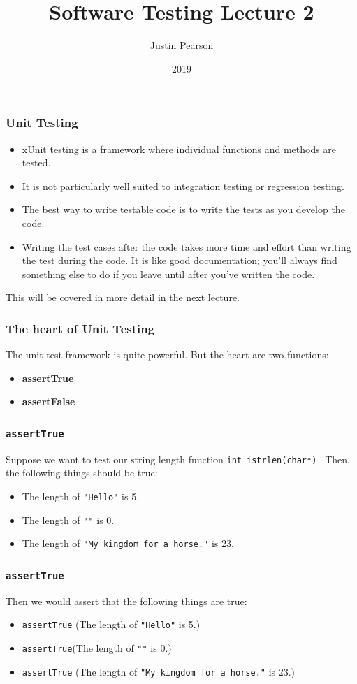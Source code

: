 \documentclass{beamer}
\title{Software Testing Lecture 2}
\author{Justin Pearson}
\date{2019}
\begin{document}
\begin{frame}
  \maketitle
\end{frame}
\begin{frame}
  \frametitle{Unit Testing}
  \begin{itemize}
  \item xUnit testing is a framework where individual functions and
    methods are tested. 
  \item It is not particularly well suited to integration testing or
    regression testing.
  \item The best way to write testable code is to write the tests as
    you develop the code. 
  \item Writing the test cases after the code takes more time and
    effort than writing the test during the code. It is like good
    documentation; you'll always find something else to do if you leave
    until after you've written the code.  
  \end{itemize}
  This will be covered in more detail in the next lecture.
\end{frame}
\begin{frame}
  \frametitle{The heart of Unit Testing}

  The unit test framework is quite powerful. But the heart are two
  functions:
  \begin{itemize}
  \item {\bf assertTrue} 
  \item {\bf assertFalse}
  \end{itemize}
\end{frame}

\begin{frame}
  \frametitle{{\tt assertTrue}}
 Suppose we want to test our string length function {\tt int
   istrlen(char*) }
Then, the following things should be true:
\begin{itemize}
\item The length of {\tt "Hello"} is 5.
\item The length of {\tt ""} is 0.
\item The length of {\tt "My kingdom for a horse."} is 23.
\end{itemize}
\end{frame}
\begin{frame}
  \frametitle{{\tt assertTrue}}
Then we would assert that the following things are true:
\begin{itemize}
\item {\tt assertTrue} (The length of {\tt "Hello"} is 5.)
\item  {\tt assertTrue}(The length of {\tt ""} is 0.)
\item  {\tt assertTrue} (The length of {\tt "My kingdom for a horse."}
  is 23.)
\end{itemize}
\end{frame}
\end{document}
